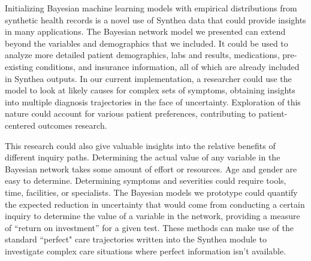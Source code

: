 \documentclass[11pt]{article}
\begin{document}
Initializing Bayesian machine learning models with empirical distributions from synthetic health records is a novel use of Synthea data that could provide insights in many applications.  The Bayesian network model we presented can extend beyond the variables and demographics that we included.  It could be used to analyze more detailed patient demographics, labs and results, medications, pre-existing conditions, and insurance information, all of which are already included in Synthea outputs.  In our current implementation, a researcher could use the model to look at likely causes for complex sets of symptoms, obtaining insights into multiple diagnosis trajectories in the face of uncertainty.  Exploration of this nature could account for various patient preferences, contributing to patient-centered outcomes research.  

This research could also give valuable insights into the relative benefits of different inquiry paths.  Determining the actual value of any variable in the Bayesian network takes some amount of effort or resources.  Age and gender are easy to determine.  Determining symptoms and severities could require tools, time, facilities, or specialists.  The Bayesian models we prototype could quantify the expected reduction in uncertainty that would come from conducting a certain inquiry to determine the value of a variable in the network, providing a measure of ``return on investment'' for a given test.  These methods can make use of the standard ``perfect" care trajectories written into the Synthea module to investigate complex care situations where perfect information isn't available.  

\clearpage






\end{document}
